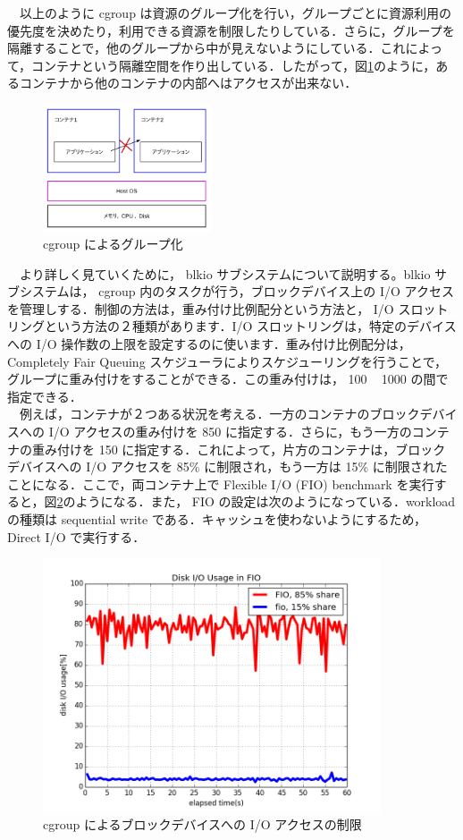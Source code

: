 \documentclass[graduation-thesis]{jsarticle}
\begin{document}
　以上のように cgroup は資源のグループ化を行い，グループごとに資源利用の優先度を決めたり，利用できる資源を制限したりしている．さらに，グループを隔離することで，他のグループから中が見えないようにしている．これによって，コンテナという隔離空間を作り出している．したがって，図\ref{fig:grouping}のように，あるコンテナから他のコンテナの内部へはアクセスが出来ない．\\
\begin{figure}[H]
	\begin{center}
		\includegraphics[width=5.0cm, clip]{images/kakuri.pdf}
		\caption{cgroup によるグループ化}
		\label{fig:grouping}
	\end{center}
\end{figure}
　より詳しく見ていくために， blkio サブシステムについて説明する。blkio サブシステムは， cgroup 内のタスクが行う，ブロックデバイス上の I/O アクセスを管理しする．制御の方法は，重み付け比例配分という方法と， I/O スロットリングという方法の２種類があります．I/O スロットリングは，特定のデバイスへの I/O 操作数の上限を設定するのに使います．重み付け比例配分は， Completely Fair Queuing スケジューラによりスケジューリングを行うことで，グループに重み付けをすることができる．この重み付けは， 100 ~ 1000 の間で指定できる．\\
　例えば，コンテナが２つある状況を考える．一方のコンテナのブロックデバイスへの I/O アクセスの重み付けを 850 に指定する．さらに，もう一方のコンテナの重み付けを 150 に指定する．これによって，片方のコンテナは，ブロックデバイスへの I/O アクセスを 85\% に制限され，もう一方は 15\% に制限されたことになる．ここで，両コンテナ上で Flexible I/O (FIO) benchmark を実行すると，図\ref{fig:blkio}のようになる．また， FIO の設定は次のようになっている．workload の種類は sequential write である．キャッシュを使わないようにするため， Direct I/O で実行する．\\
\begin{figure}[H]
	\begin{center}
		\includegraphics[width=10.0cm]{images/fio_nofsync85.png}
		\caption{cgroup によるブロックデバイスへの I/O アクセスの制限}
		\label{fig:blkio}
	\end{center}
\end{figure}
\end{document}
